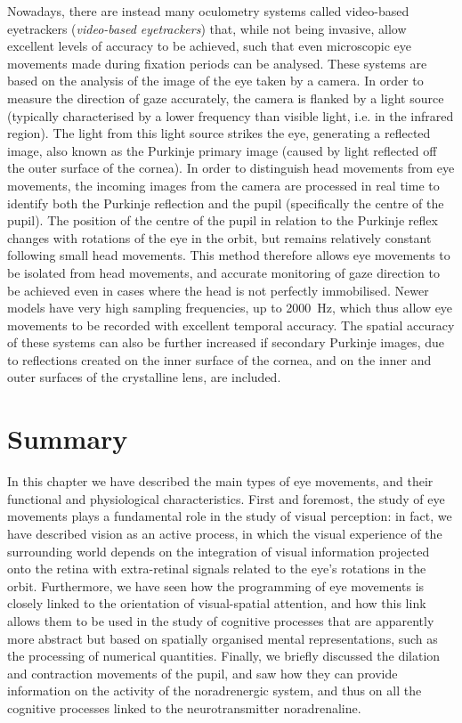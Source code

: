 \documentclass[11pt]{article}
\begin{document}
Nowadays, there are instead many oculometry systems called video-based eyetrackers (\textit{video-based eyetrackers}) that, while not being invasive, allow excellent levels of accuracy to be achieved, such that even microscopic eye movements made during fixation periods can be analysed. These systems are based on the analysis of the image of the eye taken by a camera. In order to measure the direction of gaze accurately, the camera is flanked by a light source (typically characterised by a lower frequency than visible light, i.e. in the infrared region). The light from this light source strikes the eye, generating a reflected image, also known as the Purkinje primary image (caused by light reflected off the outer surface of the cornea). In order to distinguish head movements from eye movements, the incoming images from the camera are processed in real time to identify both the Purkinje reflection and the pupil (specifically the centre of the pupil). The position of the centre of the pupil in relation to the Purkinje reflex changes with rotations of the eye in the orbit, but remains relatively constant following small head movements. This method therefore allows eye movements to be isolated from head movements, and accurate monitoring of gaze direction to be achieved even in cases where the head is not perfectly immobilised. Newer models have very high sampling frequencies, up to 2000~Hz, which thus allow eye movements to be recorded with excellent temporal accuracy. The spatial accuracy of these systems can also be further increased if secondary Purkinje images, due to reflections created on the inner surface of the cornea, and on the inner and outer surfaces of the crystalline lens, are included.


\section{Summary}
In this chapter we have described the main types of eye movements, and their functional and physiological characteristics. First and foremost, the study of eye movements plays a fundamental role in the study of visual perception: in fact, we have described vision as an active process, in which the visual experience of the surrounding world depends on the integration of visual information projected onto the retina with extra-retinal signals related to the eye's rotations in the orbit. Furthermore, we have seen how the programming of eye movements is closely linked to the orientation of visual-spatial attention, and how this link allows them to be used in the study of cognitive processes that are apparently more abstract but based on spatially organised mental representations, such as the processing of numerical quantities. Finally, we briefly discussed the dilation and contraction movements of the pupil, and saw how they can provide information on the activity of the noradrenergic system, and thus on all the cognitive processes linked to the neurotransmitter noradrenaline.
\end{document}
